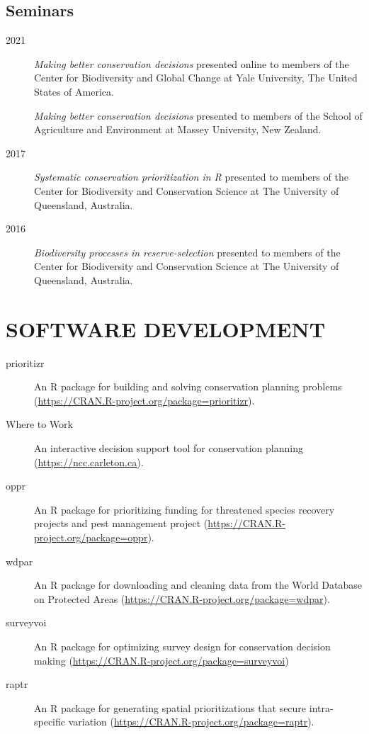 \documentclass[12pt,a4paper]{article}
\begin{document}
\subsection*{Seminars}
\begin{description}

\item[2021] \textit{Making better conservation decisions} presented online to members of the Center for Biodiversity and Global Change at Yale University, The United States of America.

\item[] \textit{Making better conservation decisions} presented to members of the School of Agriculture and Environment at Massey University, New Zealand.

\item[2017] \textit{Systematic conservation prioritization in R} presented to members of the Center for Biodiversity and Conservation Science at The University of Queensland, Australia.

\item[2016] \textit{Biodiversity processes in reserve-selection} presented to members of the Center for Biodiversity and Conservation Science at The University of Queensland, Australia.

\end{description}

\section*{SOFTWARE DEVELOPMENT}
\begin{description}

\item[prioritizr] An R package for building and solving conservation planning problems (\url{https://CRAN.R-project.org/package=prioritizr}).

\item[Where to Work] An interactive decision support tool for conservation planning (\url{https://ncc.carleton.ca}).

\item[oppr] An R package for prioritizing funding for threatened species recovery projects and pest management project (\url{https://CRAN.R-project.org/package=oppr}).

\item[wdpar] An R package for downloading and cleaning data from the World Database on Protected Areas (\url{https://CRAN.R-project.org/package=wdpar}).

\item[surveyvoi] An R package for optimizing survey design for conservation decision making (\url{https://CRAN.R-project.org/package=surveyvoi})

\item[raptr] An R package for generating spatial prioritizations that secure intra-specific variation (\url{https://CRAN.R-project.org/package=raptr}).

\end{description}
\end{document}
